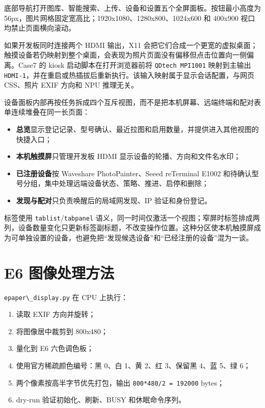 底部导航打开图库、智能搜索、上传、设备和设置五个全屏面板。按钮最小高度为
56px，图片网格固定宽高比；1920x1080、1280x800、1024x600 和 400x900
视口均禁止页面横向滚动。

如果开发板同时连接两个 HDMI 输出，X11
会把它们合成一个更宽的虚拟桌面；触摸设备若仍映射到整个桌面，会表现为照片页面没有偏移但点击位置向一侧偏离。Case7
的 kiosk 启动脚本在打开浏览器前将
\passthrough{\lstinline!QDtech MPI1001!} 映射到主输出
\passthrough{\lstinline!HDMI-1!}，并在重启或热插拔后重新执行。该输入映射属于显示会话配置，与网页
CSS、照片 EXIF 方向和 NPU 推理无关。

设备面板内部再按任务拆成四个互斥视图，而不是把本机屏幕、远端终端和配对表单连续堆叠在同一长页面：

\begin{itemize}
\tightlist
\item
  \textbf{总览}显示登记记录、型号确认、最近拉图和启用数量，并提供进入其他视图的快捷入口；
\item
  \textbf{本机触摸屏}只管理开发板 HDMI
  显示设备的轮播、方向和文件名水印；
\item
  \textbf{已注册设备}按 Waveshare PhotoPainter、Seeed reTerminal E1002
  和待确认型号分组，集中处理远端设备状态、策略、推进、启停和删除；
\item
  \textbf{发现与配对}只负责唤醒后的局域网发现、IP 验证和身份登记。
\end{itemize}

标签使用
\passthrough{\lstinline!tablist!}/\passthrough{\lstinline!tabpanel!}
语义，同一时间仅激活一个视图；窄屏时标签排成两列，设备数量变化只更新标签副标题，不改变操作位置。这种分区使本机触摸屏成为可单独设置的设备，也避免把``发现候选设备''和``已经注册的设备''混为一谈。

\section{E6 图像处理方法}\label{e6-ux56feux50cfux5904ux7406ux65b9ux6cd5}

\passthrough{\lstinline!epaper\_display.py!} 在 CPU 上执行：

\begin{enumerate}
\def\labelenumi{\arabic{enumi}.}
\tightlist
\item
  读取 EXIF 方向并旋转；
\item
  将图像居中裁剪到 800x480；
\item
  量化到 E6 六色调色板；
\item
  使用官方稀疏颜色编号：黑 0、白 1、黄 2、红 3、保留黑 4、蓝 5、绿 6；
\item
  两个像素按高半字节优先打包，输出
  \passthrough{\lstinline!800*480/2 = 192000!} bytes；
\item
  dry-run 验证初始化、刷新、BUSY 和休眠命令序列。
\end{enumerate}

